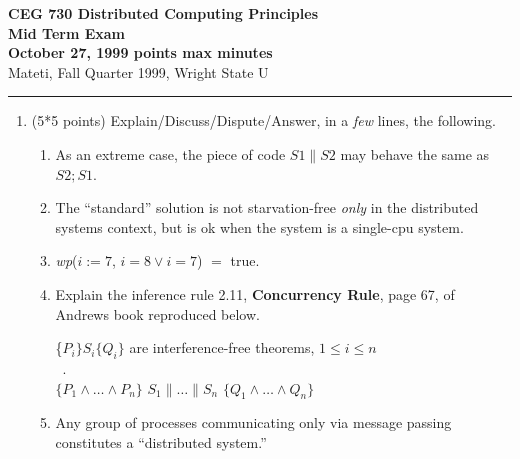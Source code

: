 \def\CSP{{\sc csp}}
\def\RPC{{\sc rpc}}
\def\co{{\bf co}}
\def\oc{{\bf oc}}
\def\zand{\wedge}\def\zor{\vee}	\def\znot{\neg}
\def\ellipsis{\ldots}
\def\pbar{\parallel}
\def\fat{\framebox[1mm]{\rule{0mm}{2mm}}}
\def\rar{\rightarrow}
\def\lb{\langle}
\def\rb{\rangle}
\def\ra{\rightarrow}
\def\await{{\bf await}}
\parindent=0pt



{\bf CEG 
\large \bf 730 Distributed Computing Principles\\[5pt]
\large Mid Term Exam\\[10pt]
October 27, 1999  points max  minutes\\
}
\bigskip
{Mateti,  Fall Quarter 1999, Wright State U}\\[-5pt]
\hrule

\begin{enumerate}

\item (5*5 points)
Explain/Discuss/Dispute/Answer, in a {\em few} lines, the following.

\begin{enumerate}
\item
As an extreme case, the piece of code $ S1 \pbar S2 $ may behave the same as
{$ S2 ; S1 $}.

\item 
The ``standard'' solution  \noindent is not
starvation-free {\em only} in the distributed systems context, but is ok
when the system is a single-cpu system.

\item
{\it wp}($i := 7$, $i = 8 \zor i = 7$) $=$ true.

\item
Explain the inference rule 2.11, {\bf Concurrency Rule}, page 67, of
Andrews book reproduced below.

\begin{centering}
\{$P_i\} S_i \{Q_i\}$ are interference-free theorems, $1 \leq i \leq
n$\\[-8pt]
~.\hrulefill\\[-4pt]
$\{P_1 \zand \ellipsis \zand P_n\}$
\quad\co\quad $S_1 \pbar \ellipsis \pbar S_n$ \quad\oc\quad
$\{Q_1 \zand \ellipsis \zand Q_n\}$\par
\end{centering}

\item Any group of processes communicating only via message passing
constitutes a ``distributed system.''
\end{enumerate}


\end{enumerate}
